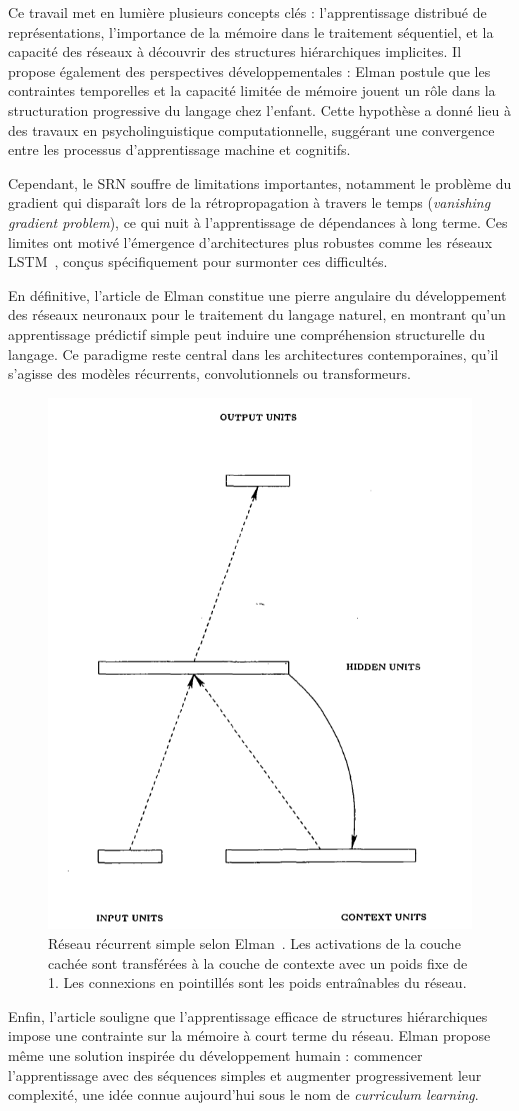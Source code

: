 \documentclass[12pt]{report}
\begin{document}
Ce travail met en lumière plusieurs concepts clés : l’apprentissage distribué de représentations, l’importance de la mémoire dans le traitement séquentiel, et la capacité des réseaux à découvrir des structures hiérarchiques implicites. Il propose également des perspectives développementales : Elman postule que les contraintes temporelles et la capacité limitée de mémoire jouent un rôle dans la structuration progressive du langage chez l’enfant. Cette hypothèse a donné lieu à des travaux en psycholinguistique computationnelle, suggérant une convergence entre les processus d’apprentissage machine et cognitifs.

Cependant, le SRN souffre de limitations importantes, notamment le problème du gradient qui disparaît lors de la rétropropagation à travers le temps (\textit{vanishing gradient problem}), ce qui nuit à l’apprentissage de dépendances à long terme. Ces limites ont motivé l’émergence d’architectures plus robustes comme les réseaux LSTM~\cite{hochreiter1997long}, conçus spécifiquement pour surmonter ces difficultés.

En définitive, l’article de Elman constitue une pierre angulaire du développement des réseaux neuronaux pour le traitement du langage naturel, en montrant qu’un apprentissage prédictif simple peut induire une compréhension structurelle du langage. Ce paradigme reste central dans les architectures contemporaines, qu’il s’agisse des modèles récurrents, convolutionnels ou transformeurs.

\begin{figure}[H]
\centering
\includegraphics[width=0.3\linewidth]{rnn_elman.png}
\caption{Réseau récurrent simple selon Elman~\cite{elman1990finding}. Les activations de la couche cachée sont transférées à la couche de contexte avec un poids fixe de 1. Les connexions en pointillés sont les poids entraînables du réseau.}
\label{fig:elman_rnn}
\end{figure}

Enfin, l’article souligne que l’apprentissage efficace de structures hiérarchiques impose une contrainte sur la mémoire à court terme du réseau. Elman propose même une solution inspirée du développement humain : commencer l’apprentissage avec des séquences simples et augmenter progressivement leur complexité, une idée connue aujourd’hui sous le nom de \textit{curriculum learning}.
\end{document}
